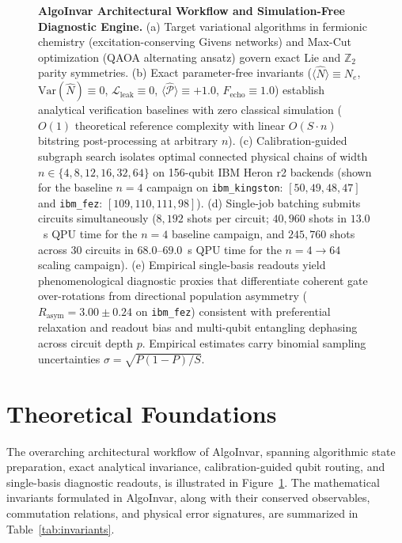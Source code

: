 \documentclass[aps,pra,reprint,superscriptaddress,floatfix,nofootinbib]{revtex4-2}
\begin{document}
\begin{figure}[!p]
{\begin{tikzpicture}
\end{tikzpicture}%
}
\caption{\textbf{AlgoInvar Architectural Workflow and Simulation-Free Diagnostic Engine.} (a) Target variational algorithms in fermionic chemistry (excitation-conserving Givens networks) and Max-Cut optimization (QAOA alternating ansatz) govern exact Lie and $\mathbb{Z}_2$ parity symmetries. (b) Exact parameter-free invariants ($\langle \hat{N} \rangle \equiv N_e$, $\text{Var}(\hat{N}) \equiv 0$, $\mathcal{L}_{\text{leak}} \equiv 0$, $\langle \hat{\mathcal{P}} \rangle \equiv +1.0$, $F_{\text{echo}} \equiv 1.0$) establish analytical verification baselines with zero classical simulation ($O(1)$ theoretical reference complexity with linear $O(S \cdot n)$ bitstring post-processing at arbitrary $n$). (c) Calibration-guided subgraph search isolates optimal connected physical chains of width $n \in \{4, 8, 12, 16, 32, 64\}$ on 156-qubit IBM Heron r2 backends (shown for the baseline $n = 4$ campaign on \texttt{ibm\_kingston}: $[50,49,48,47]$ and \texttt{ibm\_fez}: $[109,110,111,98]$). (d) Single-job batching submits circuits simultaneously ($8,192$ shots per circuit; $40,960$ shots in $13.0$~s QPU time for the $n = 4$ baseline campaign, and $245,760$ shots across $30$ circuits in $68.0$--$69.0$~s QPU time for the $n = 4 \to 64$ scaling campaign). (e) Empirical single-basis readouts yield phenomenological diagnostic proxies that differentiate coherent gate over-rotations from directional population asymmetry ($R_{\text{asym}} = 3.00 \pm 0.24$ on \texttt{ibm\_fez}) consistent with preferential relaxation and readout bias and multi-qubit entangling dephasing across circuit depth $p$. Empirical estimates carry binomial sampling uncertainties $\sigma = \sqrt{P(1-P)/S}$.}
\label{fig:methodology}
\end{figure}

\section{Theoretical Foundations}
The overarching architectural workflow of AlgoInvar, spanning algorithmic state preparation, exact analytical invariance, calibration-guided qubit routing, and single-basis diagnostic readouts, is illustrated in Figure~\ref{fig:methodology}. The mathematical invariants formulated in AlgoInvar, along with their conserved observables, commutation relations, and physical error signatures, are summarized in Table~\ref{tab:invariants}.
\end{document}
